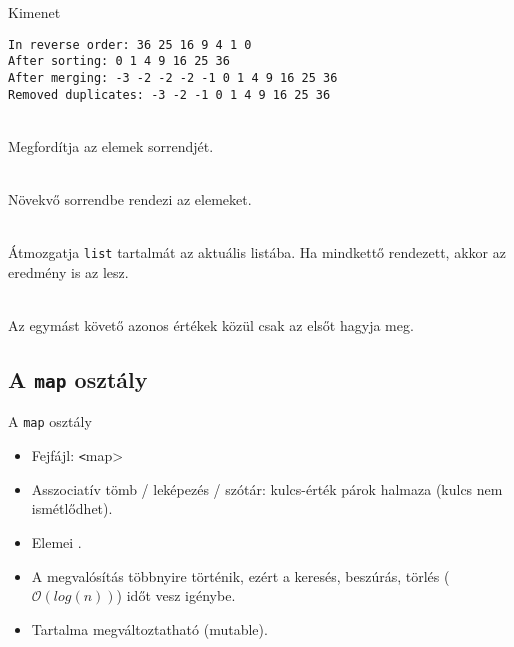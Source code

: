 \begin{frame}[fragile]
    \begin{block}{Kimenet}
        \small
        \vspace{-.4cm}
        \begin{verbatim}
In reverse order: 36 25 16 9 4 1 0 
After sorting: 0 1 4 9 16 25 36 
After merging: -3 -2 -2 -2 -1 0 1 4 9 16 25 36 
Removed duplicates: -3 -2 -1 0 1 4 9 16 25 36
\end{verbatim}
        \vspace{-.3cm}
    \end{block}
    \vfill
    \begin{description}[m]
        \small
        \item[\hiv{\href{https://en.cppreference.com/w/cpp/container/list/reverse}{\texttt{reverse()}}}] \hfill \\ Megfordítja az elemek sorrendjét.
        \item[\hiv{\href{https://en.cppreference.com/w/cpp/container/list/sort}{\texttt{sort()}}}] \hfill \\ Növekvő sorrendbe rendezi az elemeket.
        \item[\hiv{\href{https://en.cppreference.com/w/cpp/container/list/merge}{\texttt{merge(list)}}}] \hfill \\ Átmozgatja \texttt{list} tartalmát az aktuális listába. Ha mindkettő rendezett, akkor az eredmény is az lesz.
        \item[\hiv{\href{https://en.cppreference.com/w/cpp/container/list/unique}{\texttt{unique()}}}] \hfill \\ Az egymást követő azonos értékek közül csak az elsőt hagyja meg.
    \end{description}
\end{frame}

\subsection{A \texttt{map} osztály}

\begin{frame}
    A \texttt{map} osztály
    \begin{itemize}
        \item Fejfájl: \texttt<map>
        \item Asszociatív tömb / leképezés / szótár: kulcs-érték párok halmaza (kulcs nem ismétlődhet).
        \item Elemei .
        \item A megvalósítás többnyire  történik, ezért a keresés, beszúrás, törlés  ($\mathcal{O}\left(log(n)\right)$) időt vesz igénybe.
        \item Tartalma megváltoztatható (mutable).
    \end{itemize}
\end{frame}


